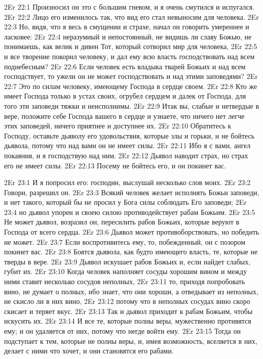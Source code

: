 \vs 2Er 22:1
Произносил он это с
большим гневом, и я очень смутился и испугался.
\vs 2Er 22:2
Лицо его изменилось так,
что вид его стал невыносим для человека.
\vs 2Er 22:3
Но, видя, что я весь в
смущении и страхе, начал он говорить умереннее и ласковее:
\vs 2Er 22:4
неразумный и непостоянный,
не видишь ли славу Божью, не понимаешь, как велик и дивен Тот, который
сотворил мир для человека,
\vs 2Er 22:5
и все творение покорил
человеку, и дал ему всю власть господствовать над всем поднебесным?
\vs 2Er 22:6
Если человек есть владыка
тварей Божьих и над всем господствует, то ужели он не может господствовать и
над этими заповедями?
\vs 2Er 22:7
Это по силам человеку,
имеющему Господа в сердце своем.
\vs 2Er 22:8
Кто же имеет Господа
только в устах своих, огрубел сердцем и далек от Господа, для того эти
заповеди тяжки и неисполнимы.
\vs 2Er 22:9
Итак вы, слабые и
нетвердые в вере, положите себе Господа вашего в сердце и узнаете, что ничего
нет легче этих заповедей, ничего приятнее и доступнее их.
\vs 2Er 22:10
Обратитесь к Господу,
оставьте дьяволу его удовольствия, которые злы и горьки, и не бойтесь дьявола,
потому что над вами он не имеет силы.
\vs 2Er 22:11
Ибо я с вами, ангел
покаяния, и я господствую над ним.
\vs 2Er 22:12
Дьявол наводит страх, но
страх его не имеет силы.
\vs 2Er 22:13
Посему не бойтесь его, и
он покинет вас.

\vs 2Er 23:1
И я попросил его:
господин, выслушай несколько слов моих.
\vs 2Er 23:2
Говори, разрешил он.
\vs 2Er 23:3
Всякий человек желает
исполнять Божьи заповеди, и нет такого, который бы не просил у Бога силы
соблюдать Его заповеди;
\vs 2Er 23:4
но дьявол упорен и своею
силою противодействует рабам Божьим.
\vs 2Er 23:5
Не может дьявол,
возразил он, пересилить рабов Божьих, которые веруют в Господа от всего
сердца.
\vs 2Er 23:6
Дьявол может
противоборствовать, но победить не может.
\vs 2Er 23:7
Если воспротивитесь ему,
то, побежденный, он с позором покинет вас.
\vs 2Er 23:8
Боятся дьявола, как будто
имеющего власть, те, которые не тверды в вере.
\vs 2Er 23:9
Дьявол искушает рабов
Божьих и, если найдет слабых, губит их.
\vs 2Er 23:10
Когда человек наполняет
сосуды хорошим вином и между ними ставит несколько сосудов неполных,
\vs 2Er 23:11
то, приходя попробовать
вино, не думает о полных, ибо знает, что они хороши, а отведывает из неполных,
не скисло ли в них вино,
\vs 2Er 23:12
потому что в неполных
сосудах вино скоро скисает и теряет вкус.
\vs 2Er 23:13
Так и дьявол приходит к
рабам Божьим, чтобы искусить их.
\vs 2Er 23:14
И все те, которые полны
веры, мужественно противятся ему; и он удаляется от них, потому что негде
войти ему.
\vs 2Er 23:15
Тогда он подступает к
тем, которые не полны веры, и, имея возможность, вселяется в них, делает с
ними что хочет, и они становятся его рабами.

